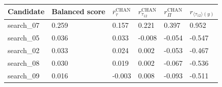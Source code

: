 \begin{tabular}{llllll}
\toprule
Candidate & Balanced score & $\overline{r}_{\tau}^{\mathrm{CHAN}}$ & $r_{\tau_{12}}^{\mathrm{CHAN}}$ & $r_{\Pi}^{\mathrm{CHAN}}$ & $r_{\langle \tau_{12} \rangle (y)}$ \\
\midrule
search_07 & 0.259 & 0.157 & 0.221 & 0.397 & 0.952 \\
search_05 & 0.036 & 0.033 & -0.008 & -0.054 & -0.547 \\
search_02 & 0.033 & 0.024 & 0.002 & -0.053 & -0.467 \\
search_08 & 0.030 & 0.019 & 0.002 & -0.067 & -0.536 \\
search_09 & 0.016 & -0.003 & 0.008 & -0.093 & -0.511 \\
\bottomrule
\end{tabular}
